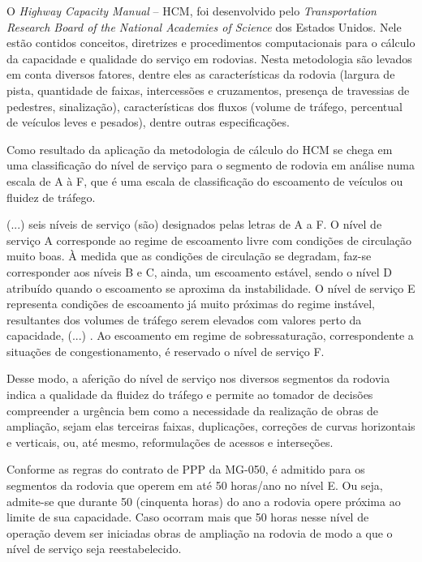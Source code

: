 \documentclass[
	12pt,				%
	openright,			%
	twoside,			%
	a4paper,			%
	english,			%
	french,				%
	spanish,			%
	brazil				%
	]{abntex2}
\begin{document}
O \emph{Highway Capacity Manual} – HCM, foi desenvolvido pelo \emph{Transportation Research Board of the National Academies of Science} dos Estados Unidos. Nele estão contidos conceitos, diretrizes e procedimentos computacionais para o cálculo da capacidade e qualidade do serviço em rodovias. Nesta metodologia são levados em conta diversos fatores, dentre eles as características da rodovia (largura de pista, quantidade de faixas, intercessões e cruzamentos, presença de travessias de pedestres, sinalização), características dos fluxos (volume de tráfego, percentual de veículos leves e pesados), dentre outras especificações.

Como resultado da aplicação da metodologia de cálculo do HCM se chega em uma classificação do nível de serviço para o segmento de rodovia em análise numa escala de A à F, que é uma escala de classificação do escoamento de veículos ou fluidez de tráfego.

\begin{citacao}
(...) seis níveis de serviço (são) designados pelas letras de A a F. O nível de serviço A corresponde ao regime de escoamento livre com condições de circulação muito boas. À medida que as condições de circulação se degradam, faz-se corresponder aos níveis B e C, ainda, um escoamento estável, sendo o nível D atribuído quando o escoamento se aproxima da instabilidade. O nível de serviço E representa condições de escoamento já muito próximas do regime instável, resultantes dos volumes de tráfego serem elevados com valores perto da capacidade, (...) . Ao escoamento em regime de sobressaturação, correspondente a situações de congestionamento, é reservado o nível de serviço F. 
\end{citacao}

Desse modo, a aferição do nível de serviço nos diversos segmentos da rodovia indica a qualidade da fluidez do tráfego e permite ao tomador de decisões compreender a urgência bem como a necessidade da realização de obras de ampliação, sejam elas terceiras faixas, duplicações, correções de curvas horizontais e verticais, ou, até mesmo, reformulações de acessos e interseções. 

Conforme as regras do contrato de PPP da MG-050, é admitido para os segmentos da rodovia que operem em até 50 horas/ano no nível E. Ou seja, admite-se que durante 50 (cinquenta horas) do ano a rodovia opere próxima ao limite de sua capacidade. Caso ocorram mais que 50 horas nesse nível de operação devem ser iniciadas obras de ampliação na rodovia de modo a que o nível de serviço seja reestabelecido. 
\end{document}
